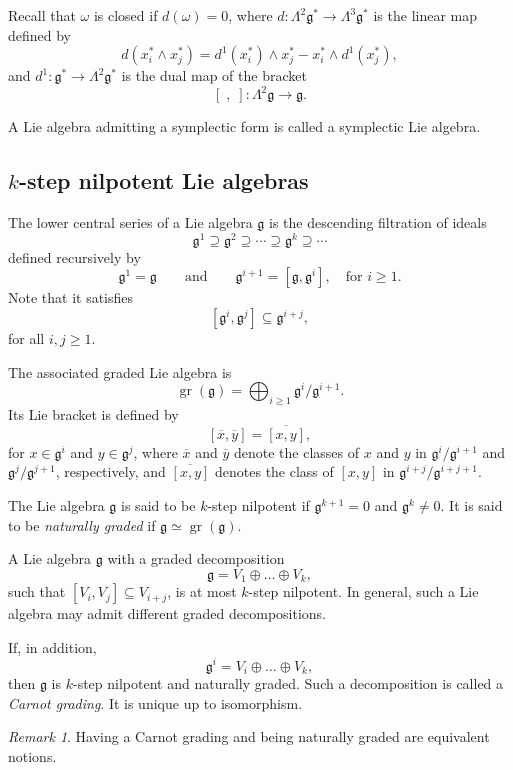 \documentclass[a4paper,11pt]{amsart}
\theoremstyle{definition}
\theoremstyle{remark}
\newtheorem{remark}[theorem]{Remark}
\numberwithin{equation}{section}
\newcommand{\g}{\mathfrak{g}}
\begin{document}
Recall that $\omega$ is closed if $d(\omega)=0$, where $d:\Lambda^2\g^* \to \Lambda^3\g^*$ is the linear map defined by
\[
d(x^*_i\wedge x^*_j)=d^1(x^*_i)\wedge x^*_j-x^*_i\wedge d^1(x^*_j),
\]
and $d^1:\g^* \to \Lambda^2\g^*$ is the dual map of the bracket
\[
[\;,\;]:\Lambda^2\g \to \g.
\]

A Lie algebra admitting a symplectic form is called a symplectic Lie algebra.


\subsection{$k$-step nilpotent Lie algebras}

The lower central series of a Lie algebra $\g$ is the descending filtration of ideals
\[
\g^1\supseteq \g^2 \supseteq \cdots \supseteq \g^k \supseteq \cdots
\]
defined recursively by
\[
\g^1=\g \qquad\text{and}\qquad \g^{i+1}=[\g,\g^i], \quad \text{for } i\ge 1.
\]
Note that it satisfies
\[
[\g^i,\g^j]\subseteq \g^{i+j},
\]
for all \(i,j\ge 1\).

The associated graded Lie algebra is
\[
\operatorname{gr}(\g)= \bigoplus_{i\ge 1} \g^i/\g^{i+1}.
\]
Its Lie bracket is defined by
\[
[\overline{x},\overline{y}] = \overline{[x,y]},
\]
for $x\in\g^i$ and $y\in\g^j$, where $\overline{x}$ and $\overline{y}$ denote the classes of $x$ and $y$ in
$\g^i/\g^{i+1}$ and $\g^j/\g^{j+1}$, respectively, and $\overline{[x,y]}$ denotes the class of $[x,y]$ in $\g^{i+j}/\g^{i+j+1}$.

The Lie algebra $\g$ is said to be $k$-step nilpotent if $\g^{k+1}=0$ and $\g^{k}\ne 0$. It is said to be \emph{naturally graded} if $\g\simeq \operatorname{gr}(\g)$.

A Lie algebra $\g$ with a graded decomposition
\begin{equation}\label{eqn:graded}
	\g=V_1\oplus\dots\oplus V_k,
\end{equation}
such that $[V_i,V_j]\subseteq V_{i+j}$, is at most $k$-step nilpotent. In general, such a Lie algebra may admit different graded decompositions.

If, in addition,
\begin{equation}\label{eqn:carnot}
	\g^i=V_i\oplus\dots\oplus V_k,
\end{equation}
then $\g$ is $k$-step nilpotent and naturally graded. Such a decomposition is called a \emph{Carnot grading}. It is unique up to isomorphism.

\begin{remark}
	Having a Carnot grading and being naturally graded are equivalent notions.
\end{remark}
\end{document}
